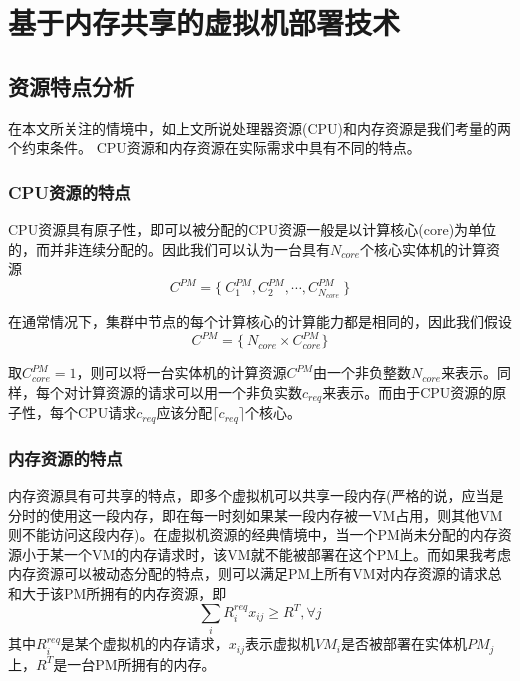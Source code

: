 
\chapter{基于内存共享的虚拟机部署技术}
\label{chap:3}

\section{资源特点分析}

在本文所关注的情境中，如上文所说处理器资源(CPU)和内存资源是我们考量的两个约束条件。
CPU资源和内存资源在实际需求中具有不同的特点。

\subsection*{CPU资源的特点}
\label{sec:cpu-character}

CPU资源具有原子性，即可以被分配的CPU资源一般是以计算核心(core)为单位的，而并非连续分配的。因此我们可以认为一台具有$N_{core}$个核心实体机的计算资源
\begin{equation}
  \label{eq:1}
C^{PM}=\{\ C^{PM}_1,C^{PM}_2,\cdots,C^{PM}_{N_{core}}\ \}  
\end{equation}

在通常情况下，集群中节点的每个计算核心的计算能力都是相同的，因此我们假设
\begin{equation}
  \label{eq:2}
C^{PM}=\{\ N_{core}\times C^{PM}_{core} \}  
\end{equation}

取$C^{PM}_{core} = 1$，则可以将一台实体机的计算资源$C^{PM}$由一个非负整数$N_{core}$来表示。同样，每个对计算资源的请求可以用一个非负实数$c_{req}$来表示。而由于CPU资源的原子性，每个CPU请求$c_{req}$应该分配$\lceil c_{req} \rceil $个核心。

\subsection*{内存资源的特点}
\label{sec:ram-character}

内存资源具有可共享的特点，即多个虚拟机可以共享一段内存(严格的说，应当是分时的使用这一段内存，即在每一时刻如果某一段内存被一VM占用，则其他VM则不能访问这段内存)。在虚拟机资源的经典情境中，当一个PM尚未分配的内存资源小于某一个VM的内存请求时，该VM就不能被部署在这个PM上。而如果我考虑内存资源可以被动态分配的特点，则可以满足PM上所有VM对内存资源的请求总和大于该PM所拥有的内存资源，即
\begin{equation}
\sum_{i}R^{req}_ix_{ij} \geq R^T ,\forall j 
\end{equation}
其中$R^{req}_i$是某个虚拟机的内存请求，$x_{ij}$表示虚拟机$VM_i$是否被部署在实体机$PM_j$上，$R^T$是一台PM所拥有的内存。

